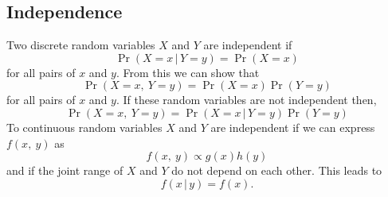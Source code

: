 \documentclass{article}
\begin{document}
\begin{multicols}{3}
    \subsection{Independence}
    Two discrete random variables \(X\) and \(Y\) are independent if
    \begin{equation*}
        \Pr{\left( X = x \,\vert\, Y = y \right)} = \Pr{\left( X = x \right)}
    \end{equation*}
    for all pairs of \(x\) and \(y\). From this we can show that
    \begin{equation*}
        \Pr{\left( X = x ,\: Y = y \right)} = \Pr{\left( X = x \right)} \Pr{\left( Y = y \right)}
    \end{equation*}
    for all pairs of \(x\) and \(y\). If these random variables are not independent then,
    \begin{equation*}
        \Pr{\left( X = x ,\: Y = y \right)} = \Pr{\left( X = x \,\vert\, Y = y \right)} \Pr{\left( Y = y \right)}
    \end{equation*}
    To continuous random variables \(X\) and \(Y\) are independent if we can express \(f\left( x,\: y \right)\) as
    \begin{equation*}
        f\left( x,\: y \right) \propto g\left( x \right) h\left( y \right)
    \end{equation*}
    and if the joint range of \(X\) and \(Y\) do not depend on each other. This leads to
    \begin{equation*}
        f\left( x \,\vert\, y \right) = f\left( x \right).
    \end{equation*}

\end{multicols}
\end{document}
